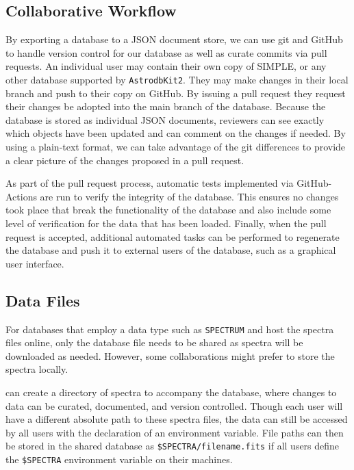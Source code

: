 \documentclass[iop,revtex4,natbib209]{emulateapj}
\begin{document}
\subsection{Collaborative Workflow}{\label{sec:use_shared}}

By exporting a database to a JSON document store, we can use git and GitHub to handle version control for our database as well as curate commits via pull requests. 
An individual user may contain their own copy of SIMPLE, or any other database supported by \texttt{AstrodbKit2}. They may make changes in their local branch and push to their copy on GitHub. By issuing a pull request they request their changes be adopted into the main branch of the database. Because the database is stored as individual JSON documents, reviewers can see exactly which objects have been updated and can comment on the changes if needed. 
By using a plain-text format, we can take advantage of the git differences to provide a clear picture of the changes proposed in a pull request. 

As part of the pull request process, automatic tests implemented via GitHub-Actions are run to verify the integrity of the database. This ensures no changes took place that break the functionality of the database and also include some level of verification for the data that has been loaded. 
Finally, when the pull request is accepted, additional automated tasks can be performed to regenerate the database and push it to external users of the database, such as a graphical user interface.

\subsection{Data Files}

For databases that employ a data type such as \texttt{SPECTRUM} and host the spectra files online, only the database file needs to be shared as spectra will be downloaded as needed. However, some collaborations might prefer to store the spectra locally. 

can create a directory of spectra to accompany the database, where changes to data can be curated, documented, and version controlled. Though each user will have a different absolute path to these spectra files, the data can still be accessed by all users with the declaration of an environment variable. 
File paths can then be stored in the shared database as \texttt{\$SPECTRA/filename.fits} if all users define the \texttt{\$SPECTRA} environment variable on their machines.
\end{document}

